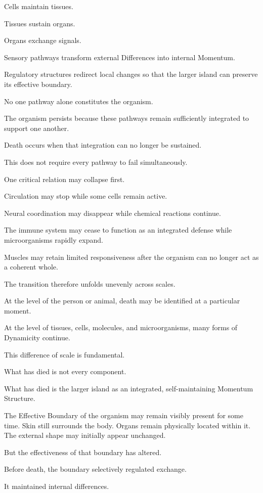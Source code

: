 Cells maintain tissues.

Tissues sustain organs.

Organs exchange signals.

Sensory pathways transform external Differences into internal Momentum.

Regulatory structures redirect local changes so that the larger island can preserve its effective boundary.

No one pathway alone constitutes the organism.

The organism persists because these pathways remain sufficiently integrated to support one another.

Death occurs when that integration can no longer be sustained.

This does not require every pathway to fail simultaneously.

One critical relation may collapse first.

Circulation may stop while some cells remain active.

Neural coordination may disappear while chemical reactions continue.

The immune system may cease to function as an integrated defense while microorganisms rapidly expand.

Muscles may retain limited responsiveness after the organism can no longer act as a coherent whole.

The transition therefore unfolds unevenly across scales.

At the level of the person or animal, death may be identified at a particular moment.

At the level of tissues, cells, molecules, and microorganisms, many forms of Dynamicity continue.

This difference of scale is fundamental.

What has died is not every component.

What has died is the larger island as an integrated, self-maintaining Momentum Structure.

The Effective Boundary of the organism may remain visibly present for some time. Skin still surrounds the body. Organs remain physically located within it. The external shape may initially appear unchanged.

But the effectiveness of that boundary has altered.

Before death, the boundary selectively regulated exchange.

It maintained internal differences.

